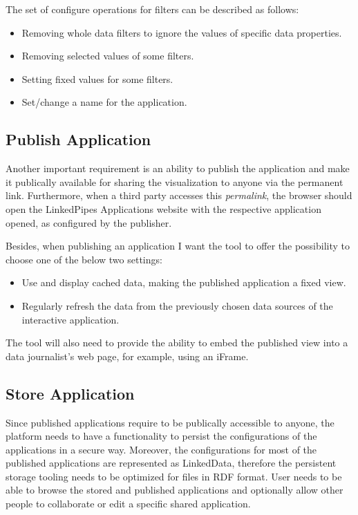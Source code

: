 The set of configure operations for filters can be described as follows:

\begin{itemize}
\item Removing whole data filters to ignore the values of specific data properties.
\item Removing selected values of some filters.
\item Setting fixed values for some filters.
\item Set/change a name for the application.
\end{itemize}

\subsection{Publish Application}

Another important requirement is an ability to publish the application and make it publically available for sharing the visualization to anyone via the permanent link. Furthermore, when a third party accesses this \textit{permalink}, the browser should open the LinkedPipes Applications website with the respective application opened, as configured by the publisher.

Besides, when publishing an application I want the tool to offer the possibility to choose one of the below two settings:

\begin{itemize}
\item Use and display cached data, making the published application a fixed view.
\item Regularly refresh the data from the previously chosen data sources of the interactive application.
\end{itemize}

The tool will also need to provide the ability to embed the published view into a data journalist's web page, for example, using an iFrame.

\subsection{Store Application}

Since published applications require to be publically accessible to anyone, the platform needs to have a functionality to persist the configurations of the applications in a secure way. Moreover, the configurations for most of the published applications are represented as LinkedData, therefore the persistent storage tooling needs to be optimized for files in RDF format. 
User needs to be able to browse the stored and published applications and optionally allow other people to collaborate or edit a specific shared application. 

